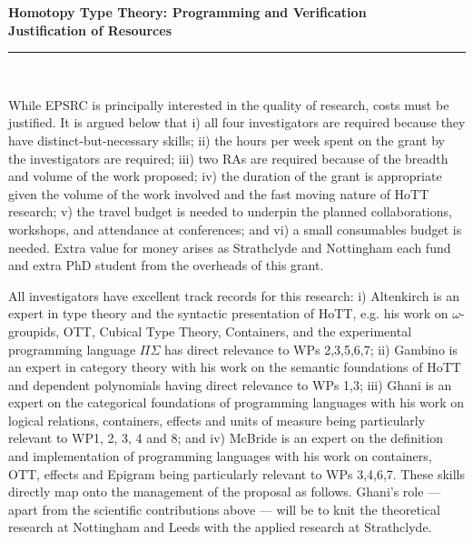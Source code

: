 \documentclass[a4paper,11pt]{article}
\begin{document}
\thispagestyle{plain}
\begin{center}
  {\Large \bf Homotopy Type Theory: Programming and Verification\\
\vspace{0.2in}
  Justification of Resources}\\[1ex]

\vspace*{-0.1in}

\rule{160mm}{.5mm}\\[2ex]
\end{center}

\noindent While EPSRC is principally interested in the quality of
research, costs must be justified. It is argued below that i) all four
investigators are required because they have
distinct-but-necessary skills; ii) the hours per week spent on
the grant by the investigators are required; iii)  two RAs are required because of the
breadth and volume of the work proposed; iv) the duration of the
grant is appropriate given the volume of the work involved and the
fast moving nature of HoTT research; v) the travel budget
is needed to underpin the planned collaborations, workshops, and
attendance at conferences; and vi) a small consumables budget is
needed. Extra value for money arises
as Strathclyde and Nottingham 
each fund and extra PhD student from the overheads of this grant.

\vspace{0.02in}

 All investigators have excellent
track records for this research: i) Altenkirch is an expert in type
theory and the syntactic presentation of HoTT, e.g. his work on
$\omega$-groupids, OTT, Cubical Type Theory, Containers, and the
experimental programming language $\Pi\Sigma$ has direct relevance to
WPs 2,3,5,6,7; ii) Gambino is an expert in category theory with his
work on the semantic foundations of HoTT and dependent polynomials
having direct relevance to WPs 1,3; iii) Ghani is an expert on the
categorical foundations of programming languages with his work on
logical relations, containers, effects and units of measure being
particularly relevant to WP1, 2, 3, 4 and 8; and iv) McBride is an
expert on the definition and implementation of programming languages
with his work on containers, OTT, effects and Epigram being
particularly relevant to WPs 3,4,6,7. These skills directly map onto
the management of the proposal as follows. Ghani's role --- apart from
the scientific contributions above --- will be to knit the theoretical
research at Nottingham and Leeds with the applied research at Strathclyde.
\end{document}
